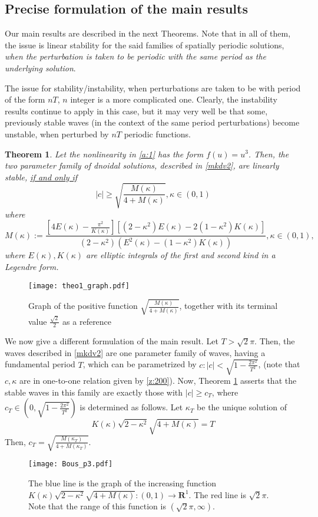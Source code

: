 \documentclass[final,11pt,leqno]{amsart}
\newtheorem{theorem}{Theorem}
\begin{document}
 \subsection{Precise formulation of the main results}
 Our main results are described   in the next Theorems. Note that in all of them, the issue is linear stability for the said families of spatially periodic
 solutions, {\it when the perturbation is taken to be periodic with the same period as the underlying solution}.

 The issue for stability/instability, when perturbations are taken to be with period of the form $nT$, $n$ integer is a more complicated one.
 Clearly, the instability results continue to apply in this case, but it may very well be that some, previously stable waves (in the context of the same period perturbations) become unstable, when perturbed by $nT$ periodic functions.

 \begin{theorem}
 \label{theo:1}
 Let the nonlinearity in \eqref{a:1} has the form $f(u)=u^3$.
 Then, the two parameter family of dnoidal solutions,  described in \eqref{mkdv2}, are linearly stable, \underline{if and only if}
 $$
 |c|\geq \sqrt{{\frac{{M({\kappa})}}{{4+M({\kappa})}}}}, {\kappa}\in (0,1)
 $$
 where
 $$
M({\kappa}):={\frac{{\left[4E({\kappa})-{\frac{{\pi^2}}{{K({\kappa})}}}\right][(2-{\kappa}^2) E({\kappa})-2(1-{\kappa}^2)K({\kappa})]}}{{(2-{\kappa}^2)(E^2({\kappa})-(1-{\kappa}^2) K({\kappa}))}}}, {\kappa}\in (0,1),
$$
where $E({\kappa}), K({\kappa})$ are  elliptic
 integrals of the first and second kind in a Legendre form.
 \end{theorem}
   \begin{figure}[h1]
\centering
\texttt{[image: theo1\_graph.pdf]}
\caption{Graph of the positive function $\sqrt{{\frac{{M({\kappa})}}{{4+M({\kappa})}}}}$, together with its terminal value  ${\frac{{\sqrt{2}}}{{2}}}$ as a reference}
\label{fig1}
\end{figure}
We now give a different formulation of the main result. Let $T>\sqrt{2} \pi$. Then, the waves described in \eqref{mkdv2} are one parameter family of waves, having a fundamental period $T$, which can be
parametrized by $c: |c|<\sqrt{1-{\frac{{2\pi^2}}{{T^2}}}}$,   (note that $c, {\kappa}$ are in one-to-one relation given by \eqref{z:200}).   Now, Theorem \ref{theo:1} asserts that the stable waves in this family are exactly those with $|c|\geq c_T$, where
$c_T\in (0,\sqrt{1-{\frac{{2\pi^2}}{{T^2}}}})$ is determined as follows. Let ${\kappa}_T$ be the unique solution of
$$
K({\kappa}) \sqrt{2-{\kappa}^2} \sqrt{4+M({\kappa})}=T
$$
Then, $c_T=\sqrt{{\frac{{M({\kappa}_T)}}{{4+M({\kappa}_T)}}}}$.
\begin{figure}[h2]
\centering
\texttt{[image: Bous\_p3.pdf]}
\caption{The blue line is the graph of the increasing function $ K({\kappa}) \sqrt{2-{\kappa}^2} \sqrt{4+M({\kappa})}:(0,1)\to {\mathbf R^1}$. The red line is $\sqrt{2}\pi$. Note that the range of this function is $(\sqrt{2}\pi, \infty)$.}
\label{fig2}
\end{figure}
\end{document}

